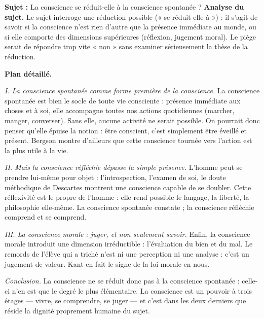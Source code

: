 \documentclass[11pt]{article}
\begin{document}
\begin{exoresolu}
\textbf{Sujet :} La conscience se réduit-elle à la conscience spontanée ?
\tcblower
\textbf{Analyse du sujet.} Le sujet interroge une réduction possible (« se réduit-elle à ») : il s'agit de savoir si la conscience n'est rien d'autre que la présence immédiate au monde, ou si elle comporte des dimensions supérieures (réflexion, jugement moral). Le piège serait de répondre trop vite « non » sans examiner sérieusement la thèse de la réduction.

\textbf{Plan détaillé.}

\emph{I. La conscience spontanée comme forme première de la conscience.} La conscience spontanée est bien le socle de toute vie consciente : présence immédiate aux choses et à soi, elle accompagne toutes nos actions quotidiennes (marcher, manger, converser). Sans elle, aucune activité ne serait possible. On pourrait donc penser qu'elle épuise la notion : être conscient, c'est simplement être éveillé et présent. Bergson montre d'ailleurs que cette conscience tournée vers l'action est la plus utile à la vie.

\emph{II. Mais la conscience réfléchie dépasse la simple présence.} L'homme peut se prendre lui-même pour objet : l'introspection, l'examen de soi, le doute méthodique de Descartes montrent une conscience capable de se doubler. Cette réflexivité est le propre de l'homme : elle rend possible le langage, la liberté, la philosophie elle-même. La conscience spontanée constate ; la conscience réfléchie comprend et se comprend.

\emph{III. La conscience morale : juger, et non seulement savoir.} Enfin, la conscience morale introduit une dimension irréductible : l'évaluation du bien et du mal. Le remords de l'élève qui a triché n'est ni une perception ni une analyse : c'est un jugement de valeur. Kant en fait le signe de la loi morale en nous.

\emph{Conclusion.} La conscience ne se réduit donc pas à la conscience spontanée : celle-ci n'en est que le degré le plus élémentaire. La conscience est un pouvoir à trois étages — vivre, se comprendre, se juger — et c'est dans les deux derniers que réside la dignité proprement humaine du sujet.
\end{exoresolu}
\end{document}
